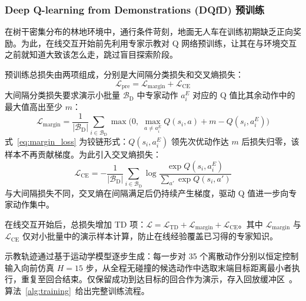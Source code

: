 \documentclass{iopjournal}
\begin{document}
\subsubsection{Deep Q-learning from Demonstrations (DQfD) 预训练}\label{sec:dqfd}

在树干密集分布的林地环境中，通行条件苛刻，地面无人车在训练初期缺乏正向奖励。为此，在线交互开始前先利用专家示教对 Q 网络预训练，让其在与环境交互之前就知道大致该怎么走，跳过盲目探索阶段。

预训练总损失由两项组成，分别是大间隔分类损失和交叉熵损失：
\begin{equation}\label{eq:dqfd_pretrain}
  \mathcal{L}_{\mathrm{pre}} =
    \mathcal{L}_{\mathrm{margin}} + \mathcal{L}_{\mathrm{CE}}
\end{equation}
大间隔分类损失要求演示小批量 $\mathcal{B}_{\mathrm{D}}$ 中专家动作 $a_{i}^{E}$ 对应的 Q 值比其余动作中的最大值高出至少 $m$：
\begin{equation}\label{eq:margin_loss}
  \mathcal{L}_{\mathrm{margin}} = \frac{1}{|\mathcal{B}_{\mathrm{D}}|}
    \sum_{i\in\mathcal{B}_{\mathrm{D}}}
    \max\!\bigl(0,\;\max_{a\neq a_{i}^{E}}Q(s_i,a) + m - Q(s_i,a_{i}^{E})\bigr)
\end{equation}
式~\eqref{eq:margin_loss} 为铰链形式：$Q(s_i,a_i^E)$ 领先次优动作达 $m$ 后损失归零，该样本不再贡献梯度。为此引入交叉熵损失：
\begin{equation}\label{eq:ce_loss}
  \mathcal{L}_{\mathrm{CE}} = -\frac{1}{|\mathcal{B}_{\mathrm{D}}|}
    \sum_{i\in\mathcal{B}_{\mathrm{D}}}
    \log\frac{\exp Q(s_i,a_{i}^{E})}{\sum_{a'}\exp Q(s_i,a')}
\end{equation}
与大间隔损失不同，交叉熵在间隔满足后仍持续产生梯度，驱动 Q 值进一步向专家动作集中。

在线交互开始后，总损失增加 TD 项：$\mathcal{L}=\mathcal{L}_{\mathrm{TD}}+\mathcal{L}_{\mathrm{margin}}+\mathcal{L}_{\mathrm{CE}}$。其中 $\mathcal{L}_{\mathrm{margin}}$ 与 $\mathcal{L}_{\mathrm{CE}}$ 仅对小批量中的演示样本计算，防止在线经验覆盖已习得的专家知识。

示教轨迹通过基于运动学模型逐步生成：每一步对 35 个离散动作分别以恒定控制输入向前仿真 $H=15$ 步，从全程无碰撞的候选动作中选取末端目标距离最小者执行，重复至回合结束。仅保留成功到达目标的回合作为演示，存入回放缓冲区~\cite{hester2018deep}。算法~\ref{alg:training}~给出完整训练流程。
\end{document}
